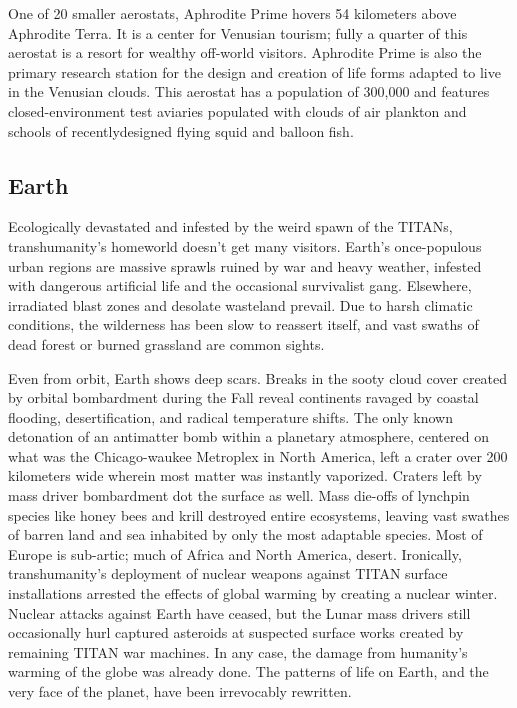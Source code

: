 One of 20 smaller aerostats, Aphrodite Prime hovers 54 kilometers above Aphrodite Terra. It is a center for Venusian tourism; fully a quarter of this aerostat is a resort for wealthy off-world visitors. Aphrodite Prime is also the primary research station for the design and creation of life forms adapted to live in the Venusian clouds. This aerostat has a population of 300,000 and features closed-environment test aviaries populated with clouds of air plankton and schools of recentlydesigned flying squid and balloon fish. 

\subsection{Earth}
\label{sec:earth} 

Ecologically devastated and infested by the weird spawn of the TITANs, transhumanity's homeworld doesn't get many visitors. Earth's once-populous urban regions are massive sprawls ruined by war and heavy weather, infested with dangerous artificial life and the occasional survivalist gang. Elsewhere, irradiated blast zones and desolate wasteland prevail. Due to harsh climatic conditions, the wilderness has been slow to reassert itself, and vast swaths of dead forest or burned grassland are common sights. 

Even from orbit, Earth shows deep scars. Breaks in the sooty cloud cover created by orbital bombardment during the Fall reveal continents ravaged by coastal flooding, desertification, and radical temperature shifts. The only known detonation of an antimatter bomb within a planetary atmosphere, centered on what was the Chicago-waukee Metroplex in North America, left a crater over 200 kilometers wide wherein most matter was instantly vaporized. Craters left by mass driver bombardment dot the surface as well. Mass die-offs of lynchpin species like honey bees and krill destroyed entire ecosystems, leaving vast swathes of barren land and sea inhabited by only the most adaptable species. Most of Europe is sub-artic; much of Africa and North America, desert. Ironically, transhumanity's deployment of nuclear weapons against TITAN surface installations arrested the effects of global warming by creating a nuclear winter. Nuclear attacks against Earth have ceased, but the Lunar mass drivers still occasionally hurl captured asteroids at suspected surface works created by remaining TITAN war machines. In any case, the damage from humanity's warming of the globe was already done. The patterns of life on Earth, and the very face of the planet, have been irrevocably rewritten. 

